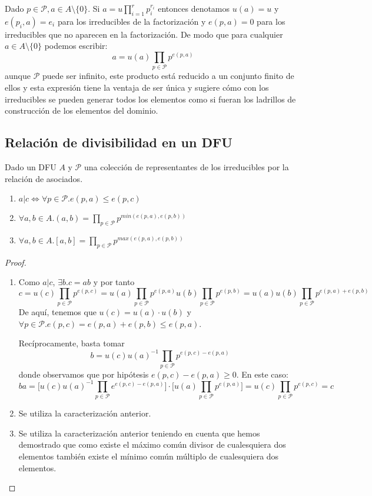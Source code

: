 \begin{definition}
Dado $p \in \mathcal{P},a \in A \setminus \{0\}$. Si $a = u\prod_{i = 1}^r p_i^{r_i}$ entonces denotamos $u(a) = u$ y $e(p_i,a) = e_i$ para los irreducibles de la factorización y $e(p,a) = 0$ para los irreducibles que no aparecen en la factorización. De modo que para cualquier $a \in A \setminus \{0\}$ podemos escribir: $$a = u(a) \prod_{p \in \mathcal{P}} p^{e(p,a)}$$ aunque $\mathcal{P}$ puede ser infinito, este producto está reducido a un conjunto finito de ellos y esta expresión tiene la ventaja de ser única y sugiere cómo con los irreducibles se pueden generar todos los elementos como si fueran los ladrillos de construcción de los elementos del dominio. 
\end{definition}

\subsection{Relación de divisibilidad en un DFU}

\begin{proposition}
Dado un DFU $A$ y $\mathcal{P}$ una colección de representantes de los irreducibles por la relación de asociados.

\begin{enumerate}
\item $a|c \iff \forall p \in \mathcal{P}. e(p,a) \le e(p,c)$
\item $\forall a,b \in A. (a,b) = \prod_{p \in \mathcal{P}} p^{min(e(p,a),e(p,b))}$
\item $\forall a,b \in A. [a,b] = \prod_{p \in \mathcal{P}} p^{max(e(p,a),e(p,b))}$
\end{enumerate}
\end{proposition}
\begin{proof}
\begin{enumerate}
\item Como $a|c$, $\exists b.c = ab$ y por tanto $$c = u(c) \prod_{p \in \mathcal{P}} p^{e(p,c)} = u(a) \prod_{p \in \mathcal{P}} p^{e(p,a)} u(b) \prod_{p \in \mathcal{P}} p^{e(p,b)} = u(a)u(b) \prod_{p \in \mathcal{P}} p^{e(p,a)+e(p,b)}$$ De aquí, tenemos que $u(c) = u(a) \cdot u(b)$ y $\forall p \in \mathcal{P}.e(p,c) = e(p,a) + e(p,b) \le e(p,a)$. 

Recíprocamente, basta tomar $$b = u(c)u(a)^{-1} \prod_{p \in \mathcal{P}} p^{e(p,c)-e(p,a)}$$ donde observamos que por hipótesis $e(p,c)-e(p,a) \ge 0$. En este caso: $$ba = \Big[u(c)u(a)^{-1} \prod_{p \in \mathcal{P}} e^{e(p,c)-e(p,a)}\Big] \cdot \Big[u(a) \prod_{p \in \mathcal{P}} p^{e(p,a)}\Big] = u(c)\prod_{p \in \mathcal{P}} p^{e(p,c)} = c$$
\item Se utiliza la caracterización anterior. 
\item Se utiliza la caracterización anterior teniendo en cuenta que hemos demostrado que como existe el máximo común divisor de cualesquiera dos elementos también existe el mínimo común múltiplo de cualesquiera dos elementos. 
\end{enumerate}
\end{proof}

